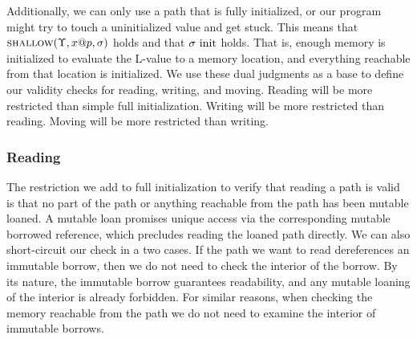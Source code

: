 Additionally, we can only use a path that is fully initialized, or our program might
try to touch a uninitialized value and get stuck.
This means that $\textsc{shallow}({\Upsilon},{{x}@{p}},{\sigma})$ holds and that $\sigma\ \textrm{init}$ holds. 
That is, enough memory is initialized to evaluate the L-value to a memory location,
and everything reachable from that location is initialized.
We use these dual judgments as a base to define our validity 
checks for reading, writing, and moving.
Reading will be more restricted than simple full initialization.
Writing will be more restricted than reading.
Moving will be more restricted than writing.

\subsubsection*{Reading}
The restriction we add to full initialization to verify that reading a path is valid is
that no part of the path or anything reachable from the path has been mutable loaned.
A mutable loan promises unique access via the corresponding mutable borrowed reference, 
which precludes reading the loaned path directly.
We can also short-circuit our check in a two cases.
If the path we want to read dereferences an immutable borrow, then we do not need
to check the interior of the borrow. By its nature, the immutable borrow guarantees readability,
and any mutable loaning of the interior is already forbidden.
For similar reasons, when checking the memory reachable from the path 
we do not need to examine the interior of immutable borrows.
\newline

\fbox{$\cnml{\gs}$}




